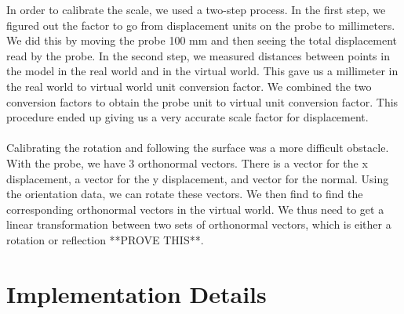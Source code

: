 \documentclass[11pt,psfig]{article}
\begin{document}
In order to calibrate the scale, we used a two-step process. In the first step, we figured out the factor to go from displacement units on the probe to millimeters. We did this by moving the probe 100 mm and then seeing the total displacement read by the probe. In the second step, we measured distances between points in the model in the real world and in the virtual world. This gave us a millimeter in the real world to virtual world unit conversion factor. We combined the two conversion factors to obtain the probe unit to virtual unit conversion factor. This procedure ended up giving us a very accurate scale factor for displacement. \\
\\
Calibrating the rotation and following the surface was a more difficult obstacle. With the probe, we have 3 orthonormal vectors. There is a vector for the x displacement, a vector for the y displacement, and vector for the normal. Using the orientation data, we can rotate these vectors. We then find to find the corresponding orthonormal vectors in the virtual world. We thus need to get a linear transformation between two sets of orthonormal vectors, which is either a rotation or reflection **PROVE THIS**.

\section*{Implementation Details}
\end{document}
